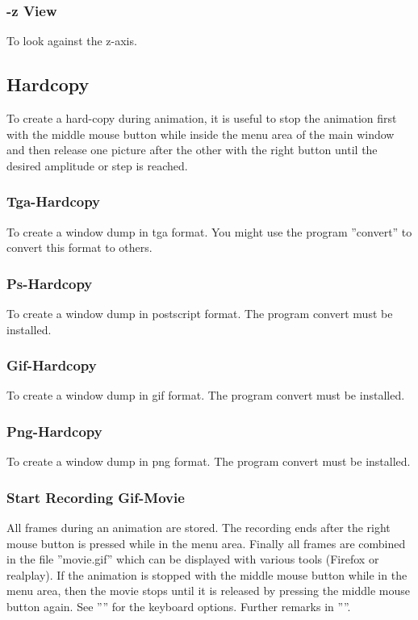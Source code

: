 \documentclass{article}
\begin{document}
\subsubsection{-z View}
To look against the z-axis.

\subsection{\label{Hardcopy}Hardcopy}
To create a hard-copy during animation, it is useful to stop the animation first with the middle mouse button while inside the menu area of the main window and then release one picture after the other with the right button until the desired amplitude or step is reached.
 
\subsubsection{\label{Tga-Hardcopy}Tga-Hardcopy}
To create a window dump in tga format. You might use the program ''convert'' \cite{ImageMagick} to convert this format to others.

\subsubsection{\label{Ps-Hardcopy}Ps-Hardcopy}
To create a window dump in postscript format. The program convert must be installed.

\subsubsection{\label{Gif-Hardcopy}Gif-Hardcopy}
To create a window dump in gif format. The program convert must be installed.

\subsubsection{\label{Png-Hardcopy}Png-Hardcopy}
To create a window dump in png format. The program convert must be installed.

\subsubsection{\label{Start Recording Gif-Movie}Start Recording Gif-Movie}
All frames during an animation are stored. The recording ends after the right mouse button is pressed while in the menu area. Finally all frames are combined in the file ''movie.gif'' which can be displayed with various tools (Firefox \cite{Firefox} or realplay). If the animation is stopped with the middle mouse button while in the menu area, then the movie stops until it is released by pressing the middle mouse button again. See '''' for the keyboard options. Further remarks in ''''.
\end{document}
